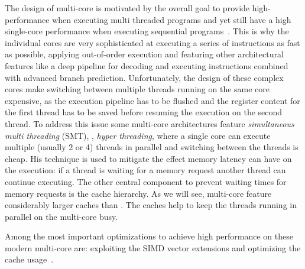 The design of multi-core \CPUs is motivated by the overall goal to provide high-performance when executing multi threaded programs and yet still have a high single-core performance when executing sequential programs~\cite{GarlandK10}.
This is why the individual cores are very sophisticated at executing a series of instructions as fast as possible, applying out-of-order execution and featuring other architectural features like a deep pipeline for decoding and executing instructions combined with advanced branch prediction.
Unfortunately, the design of these complex cores make switching between multiple threads running on the same core expensive, as the execution pipeline has to be flushed and the register content for the first thread has to be saved before resuming the execution on the second thread.
To address this issue some multi-core architectures feature \emph{simultaneous multi threading} (SMT), \aka, \emph{hyper threading}, where a single \CPU core can execute multiple (usually 2 or 4) threads in parallel and switching between the threads is cheap.
His technique is used to mitigate the effect memory latency can have on the execution:
if a thread is waiting for a memory request another thread can continue executing.
The other central component to prevent waiting times for memory requests is the cache hierarchy.
As we will see, multi-core \CPUs feature considerably larger caches than \GPUs.
The caches help to keep the threads running in parallel on the multi-core \CPU busy.

Among the most important optimizations to achieve high performance on these modern multi-core \CPUs are:
exploiting the SIMD vector extensions and optimizing the cache usage~\cite{IntelCPUOptimizingGuide}.

